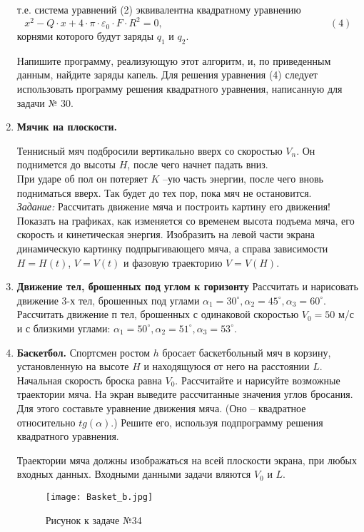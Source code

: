 \begin{enumerate}
т.е. система уравнений (2) эквивалентна квадратному уравнению
$$x^2 - Q\cdot x + 4\cdot\pi\cdot\varepsilon_0\cdot F\cdot R^2 = 0,  \hspace{200pt} (4)$$
    корнями которого будут заряды $q_1$ и $q_2$.
 
Напишите программу, реализующую этот алгоритм, и, по приведенным данным, найдите заряды капель. Для решения уравнения (4) следует использовать программу решения квадратного уравнения, написанную для задачи № 30.

  \item {\bf Мячик на плоскости.}

Теннисный мяч подбросили вертикально вверх со скоростью $V_n$. Он поднимется до высоты $H$, после чего начнет падать вниз.\\
При ударе об пол он потеряет $K$ --ую часть энергии, после чего вновь подниматься вверх. Так будет до тех пор, пока мяч не остановится.\\
{\em Задание:} Рассчитать движение мяча и построить картину его движения! Показать на графиках, как изменяется со временем высота подъема мяча, его скорость и кинетическая энергия. Изобразить на левой части экрана динамическую картинку подпрыгивающего мяча, а справа зависимости  $H= H(t)$, $V= V(t)$ и фазовую траекторию $V= V(H)$.

  \item {\bf Движение тел, брошенных под углом к горизонту} Рассчитать и нарисовать движение 3-х тел, брошенных под углами $\alpha_1 =30^\circ, \alpha_2 = 45^\circ, \alpha_3 =60^\circ$.  Рассчитать движение $п$ тел, брошенных с одинаковой скоростью   $V_0=50$ м/с  и с близкими углами: $\alpha_1 = 50^\circ, \alpha_2 = 51^\circ, \alpha_3 = 53^\circ$.

  \item {\bf Баскетбол.}
Спортсмен ростом $h$ бросает баскетбольный мяч в корзину, установленную на высоте $H$ и находящуюся от него на расстоянии $L$. Начальная скорость броска равна $V_0$. Рассчитайте и нарисуйте возможные траектории мяча. На экран выведите рассчитанные значения углов бросания.\\
Для этого составьте уравнение движения мяча. (Оно -- квадратное относительно $tg(\alpha)$.)  Решите его, используя подпрограмму решения квадратного уравнения.

Траектории мяча должны изображаться на всей плоскости экрана, при любых входных данных. Входными данными задачи  вляются  $V_0$ и $L$.

\begin{figure}[!h]
\centerline{
\texttt{[image: Basket\_b.jpg]}}
\caption{Рисунок к задаче №34}
\label{ris2}
\end{figure}


\end{enumerate}
